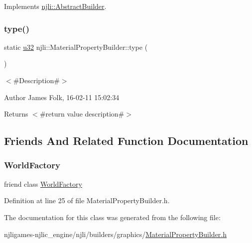 Implements \mbox{\hyperlink{classnjli_1_1_abstract_builder_ab66b774e02ccb9da554c9aab7fa6d981}{njli\+::\+Abstract\+Builder}}.

\mbox{\label{classnjli_1_1_material_property_builder_a164a98bd7a61c4bfb6ce7444b981bdba}} 
\subsubsection{\texorpdfstring{type()}{type()}}
{\footnotesize\ttfamily static \mbox{\hyperlink{_util_8h_a10e94b422ef0c20dcdec20d31a1f5049}{u32}} njli\+::\+Material\+Property\+Builder\+::type (\begin{DoxyParamCaption}{ }\end{DoxyParamCaption})\hspace{0.3cm}{\ttfamily [static]}}



$<$\#\+Description\#$>$ 

\begin{DoxyAuthor}{Author}
James Folk, 16-\/02-\/11 15\+:02\+:34
\end{DoxyAuthor}
\begin{DoxyReturn}{Returns}
$<$\#return value description\#$>$ 
\end{DoxyReturn}


\subsection{Friends And Related Function Documentation}
\mbox{\label{classnjli_1_1_material_property_builder_acb96ebb09abe8f2a37a915a842babfac}} 
\subsubsection{\texorpdfstring{World\+Factory}{WorldFactory}}
{\footnotesize\ttfamily friend class \mbox{\hyperlink{classnjli_1_1_world_factory}{World\+Factory}}\hspace{0.3cm}{\ttfamily [friend]}}



Definition at line 25 of file Material\+Property\+Builder.\+h.



The documentation for this class was generated from the following file\+:\begin{DoxyCompactItemize}
\item 
njligames-\/njlic\+\_\+engine/njli/builders/graphics/\mbox{\hyperlink{_material_property_builder_8h}{Material\+Property\+Builder.\+h}}\end{DoxyCompactItemize}
